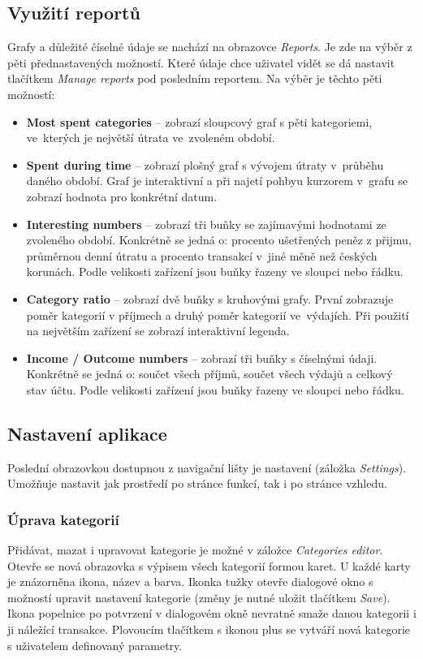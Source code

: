 \documentclass[
  biblatex,
  figures=true,
  tables=false,
  glossaries,
  index
]{kidiplom}
\begin{document}
\subsection{Využití reportů}
Grafy a důležité číselné údaje se nachází na obrazovce \textit{Reports}. Je zde na výběr z pěti přednastavených možností. Které údaje chce uživatel vidět se dá nastavit tlačítkem \textit{Manage reports} pod posledním reportem. Na výběr je těchto pěti možností:
\begin{itemize}
  \item \textbf{Most spent categories} -- zobrazí sloupcový graf s pěti kategoriemi, ve~kterých je největší útrata ve~zvoleném období.
  \item \textbf{Spent during time} -- zobrazí plošný graf s vývojem útraty v~průběhu daného období. Graf je interaktivní a při najetí pohbyu kurzorem v~grafu se zobrazí hodnota pro konkrétní datum.
  \item \textbf{Interesting numbers} -- zobrazí tři buňky se zajímavými hodnotami ze zvoleného období. Konkrétně se jedná o: procento ušetřených peněz z přijmu, průměrnou denní útratu a procento transakcí v~jiné měně než českých korunách. Podle velikosti zařízení jsou buňky řazeny ve sloupci nebo řádku.
  \item \textbf{Category ratio} -- zobrazí dvě buňky s kruhovými grafy. První zobrazuje poměr kategorií v příjmech a druhý poměr kategorií ve~výdajích. Při použití na největším zařízení se zobrazí interaktivní legenda.
  \item \textbf{Income / Outcome numbers} -- zobrazí tři buňky s číselnými údaji. Konkrétně se jedná o: součet všech příjmů, součet všech výdajů a celkový stav účtu. Podle velikosti zařízení jsou buňky řazeny ve sloupci nebo řádku.
\end{itemize}

\subsection{Nastavení aplikace}
Poslední obrazovkou dostupnou z navigační lišty je nastavení (záložka \textit{Settings}). Umožňuje nastavit jak prostředí po stránce funkcí, tak i po stránce vzhledu.

\subsubsection{Úprava kategorií}
Přidávat, mazat i upravovat kategorie je možné v záložce \textit{Categories editor}. Otevře se nová obrazovka s výpisem všech kategorií formou karet. U každé karty je znázorněna ikona, název a barva. Ikonka tužky otevře dialogové okno s možností upravit nastavení kategorie (změny je nutné uložit tlačítkem \textit{Save}). Ikona popelnice po potvrzení v dialogovém okně nevratně smaže danou kategorii i ji náležící transakce. Plovoucím tlačítkem s ikonou plus se vytváří nová kategorie s uživatelem definovaný parametry.
\end{document}
